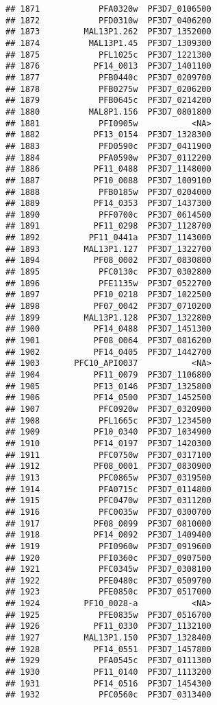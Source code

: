 \documentclass{article}\usepackage[]{graphicx}\usepackage[]{color}
\makeatletter
\newenvironment{kframe}{%
 \def\at@end@of@kframe{}%
 \ifinner\ifhmode%
  \def\at@end@of@kframe{\end{minipage}}%
  \begin{minipage}{\columnwidth}%
 \fi\fi%
 \def\FrameCommand##1{\hskip\@totalleftmargin \hskip-\fboxsep
 \colorbox{shadecolor}{##1}\hskip-\fboxsep
     \hskip-\linewidth \hskip-\@totalleftmargin \hskip\columnwidth}%
 \MakeFramed {\advance\hsize-\width
   \@totalleftmargin\z@ \linewidth\hsize
   \@setminipage}}%
 {\par\unskip\endMakeFramed%
 \at@end@of@kframe}
\newenvironment{knitrout}{}{} %
\makeatother
\begin{document}
\begin{knitrout}
\begin{kframe}
\begin{verbatim}
## 1871            PFA0320w  PF3D7_0106500
## 1872            PFD0310w  PF3D7_0406200
## 1873         MAL13P1.262  PF3D7_1352000
## 1874          MAL13P1.45  PF3D7_1309300
## 1875            PFL1025c  PF3D7_1221300
## 1876           PF14_0013  PF3D7_1401100
## 1877            PFB0440c  PF3D7_0209700
## 1878            PFB0275w  PF3D7_0206200
## 1879            PFB0645c  PF3D7_0214200
## 1880          MAL8P1.156  PF3D7_0801800
## 1881            PFI0905w           <NA>
## 1882           PF13_0154  PF3D7_1328300
## 1883            PFD0590c  PF3D7_0411900
## 1884            PFA0590w  PF3D7_0112200
## 1886           PF11_0488  PF3D7_1148000
## 1887           PF10_0088  PF3D7_1009100
## 1888            PFB0185w  PF3D7_0204000
## 1889           PF14_0353  PF3D7_1437300
## 1890            PFF0700c  PF3D7_0614500
## 1891           PF11_0298  PF3D7_1128700
## 1892          PF11_0441a  PF3D7_1143000
## 1893         MAL13P1.127  PF3D7_1322700
## 1894           PF08_0002  PF3D7_0830800
## 1895            PFC0130c  PF3D7_0302800
## 1896            PFE1135w  PF3D7_0522700
## 1897           PF10_0218  PF3D7_1022500
## 1898           PF07_0042  PF3D7_0710200
## 1899         MAL13P1.128  PF3D7_1322800
## 1900           PF14_0488  PF3D7_1451300
## 1901           PF08_0064  PF3D7_0816200
## 1902           PF14_0405  PF3D7_1442700
## 1903       PFC10_API0037           <NA>
## 1904           PF11_0079  PF3D7_1106800
## 1905           PF13_0146  PF3D7_1325800
## 1906           PF14_0500  PF3D7_1452500
## 1907            PFC0920w  PF3D7_0320900
## 1908            PFL1665c  PF3D7_1234500
## 1909           PF10_0340  PF3D7_1034900
## 1910           PF14_0197  PF3D7_1420300
## 1911            PFC0750w  PF3D7_0317100
## 1912           PF08_0001  PF3D7_0830900
## 1913            PFC0865w  PF3D7_0319500
## 1914            PFA0715c  PF3D7_0114800
## 1915            PFC0470w  PF3D7_0311200
## 1916            PFC0035w  PF3D7_0300700
## 1917           PF08_0099  PF3D7_0810000
## 1918           PF14_0092  PF3D7_1409400
## 1919            PFI0960w  PF3D7_0919600
## 1920            PFI0360c  PF3D7_0907500
## 1921            PFC0345w  PF3D7_0308100
## 1922            PFE0480c  PF3D7_0509700
## 1923            PFE0850c  PF3D7_0517000
## 1924         PF10_0028-a           <NA>
## 1925            PFE0835w  PF3D7_0516700
## 1926           PF11_0330  PF3D7_1132100
## 1927         MAL13P1.150  PF3D7_1328400
## 1928           PF14_0551  PF3D7_1457800
## 1929            PFA0545c  PF3D7_0111300
## 1930           PF11_0140  PF3D7_1113200
## 1931           PF14_0516  PF3D7_1454300
## 1932            PFC0560c  PF3D7_0313400

\end{verbatim}
\end{kframe}
\end{knitrout}
\end{document}

